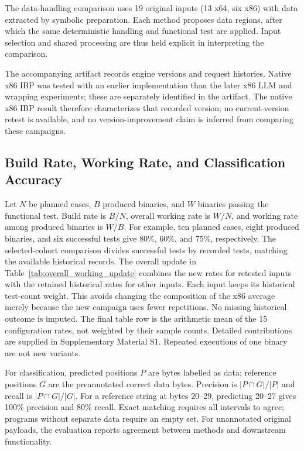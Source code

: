 The data-handling comparison uses 19 original inputs (13 x64,
six x86) with data extracted by symbolic preparation. Each method proposes
data regions, after which the same deterministic handling and functional
test are applied. Input selection and shared processing are thus held
explicit in interpreting the comparison.

The accompanying artifact records engine versions and request histories.
Native x86 IBP was tested with an earlier implementation than the later
x86 LLM and wrapping experiments; these are separately identified in the
artifact. The native x86 IBP result therefore characterizes that recorded
version; no current-version retest is available, and no version-improvement
claim is inferred from comparing these campaigns.

\subsection{Build Rate, Working Rate, and Classification Accuracy}
Let $N$ be planned cases, $B$ produced binaries, and $W$ binaries passing
the functional test. Build rate is $B/N$, overall working rate is $W/N$,
and working rate among produced binaries is $W/B$.
For example, ten planned cases, eight produced binaries, and six successful
tests give 80\%, 60\%, and 75\%, respectively. The selected-cohort comparison divides
successful tests by recorded tests, matching the available historical
records. The overall update in Table~\ref{tab:overall_working_update}
combines the new rates for retested inputs with the retained historical
rates for other inputs. Each input keeps its historical test-count weight.
This avoids changing the composition of the x86 average merely because
the new campaign uses fewer repetitions. No missing historical outcome is
imputed. The final table row is the arithmetic mean of the 15
configuration rates, not weighted by their sample counts. Detailed
contributions are supplied in Supplementary Material S1. Repeated
executions of one binary are not new variants.

For classification, predicted positions $P$ are bytes labelled as data;
reference positions $G$ are the preannotated correct data bytes. Precision
is $|P\cap G|/|P|$ and recall is $|P\cap G|/|G|$. For a reference string
at bytes 20--29, predicting 20--27 gives 100\% precision and 80\% recall.
Exact matching requires all intervals to agree; programs without separate
data require an empty set. For unannotated original payloads, the evaluation
reports agreement between methods and downstream functionality.

